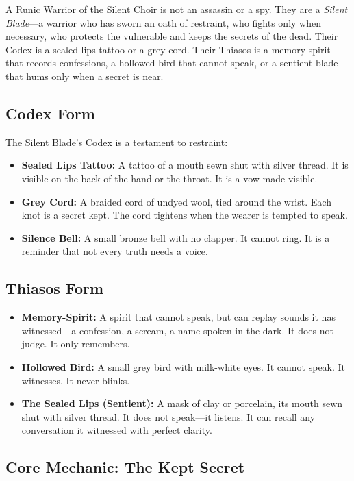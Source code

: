 A Runic Warrior of the Silent Choir is not an assassin or a spy. They are a \textit{Silent Blade}—a warrior who has sworn an oath of restraint, who fights only when necessary, who protects the vulnerable and keeps the secrets of the dead. Their Codex is a sealed lips tattoo or a grey cord. Their Thiasos is a memory-spirit that records confessions, a hollowed bird that cannot speak, or a sentient blade that hums only when a secret is near.

\subsection{Codex Form}

The Silent Blade's Codex is a testament to restraint:

\begin{itemize}
\item \textbf{Sealed Lips Tattoo:} A tattoo of a mouth sewn shut with silver thread. It is visible on the back of the hand or the throat. It is a vow made visible.
\item \textbf{Grey Cord:} A braided cord of undyed wool, tied around the wrist. Each knot is a secret kept. The cord tightens when the wearer is tempted to speak.
\item \textbf{Silence Bell:} A small bronze bell with no clapper. It cannot ring. It is a reminder that not every truth needs a voice.
\end{itemize}

\subsection{Thiasos Form}

\begin{itemize}
\item \textbf{Memory-Spirit:} A spirit that cannot speak, but can replay sounds it has witnessed—a confession, a scream, a name spoken in the dark. It does not judge. It only remembers.
\item \textbf{Hollowed Bird:} A small grey bird with milk-white eyes. It cannot speak. It witnesses. It never blinks.
\item \textbf{The Sealed Lips (Sentient):} A mask of clay or porcelain, its mouth sewn shut with silver thread. It does not speak—it listens. It can recall any conversation it witnessed with perfect clarity.
\end{itemize}

\subsection{Core Mechanic: The Kept Secret}

